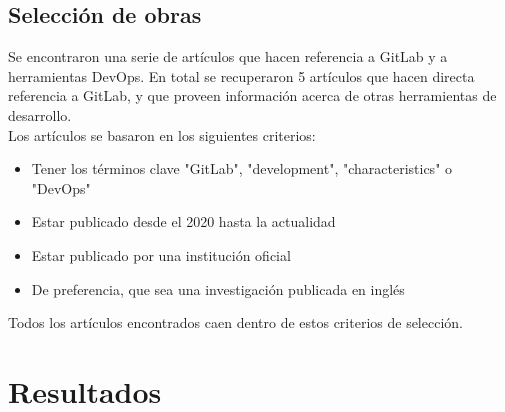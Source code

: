 \documentclass[runningheads]{llncs}
\begin{document}
\subsection{Selección de obras}
Se encontraron una serie de artículos que hacen referencia a GitLab y a herramientas DevOps. En total se
recuperaron 5 artículos que hacen directa referencia a GitLab, y que proveen información acerca de otras
herramientas de desarrollo.\\
Los artículos se basaron en los siguientes criterios:
\begin{itemize}
        \item Tener los términos clave "GitLab", "development", "characteristics" o "DevOps"
        \item Estar publicado desde el 2020 hasta la actualidad
        \item Estar publicado por una institución oficial
        \item De preferencia, que sea una investigación publicada en inglés
\end{itemize}
Todos los artículos encontrados caen dentro de estos criterios de selección.
\section{Resultados}
\end{document}
